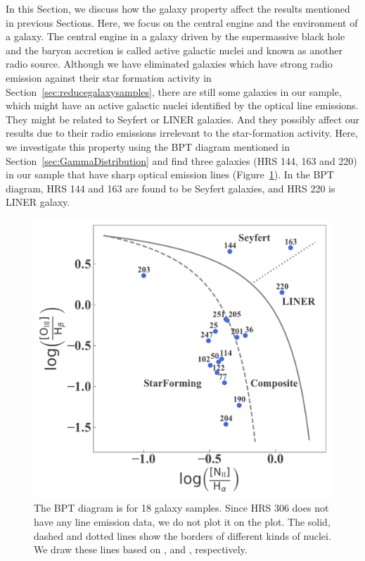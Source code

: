 In this Section, we discuss how the galaxy property affect the results mentioned in previous Sections.
Here, we focus on the central engine and the environment of a galaxy.
The central engine in a galaxy driven by the supermassive black hole and the baryon accretion is called active galactic nuclei and known as another radio source.
Although we have eliminated galaxies which have strong radio emission against their star formation activity in Section~\ref{sec:reducegalaxysamples}, there are still some galaxies in our sample, which might have an active galactic nuclei identified by the optical line emissions.
They might be related to Seyfert or LINER galaxies. 
And they possibly affect our results due to their radio emissions irrelevant to the star-formation activity.
Here, we investigate this property using the BPT diagram mentioned in Section~\ref{sec:GammaDistribution} and find three galaxies (HRS 144, 163 and 220) in our sample that have sharp optical emission lines (Figure~\ref{fig:bpt_diagram}).
In the BPT diagram, HRS 144 and 163 are found to be Seyfert galaxies, and HRS 220 is LINER galaxy.

\begin{figure}[htbp]
	\centering
	\includegraphics[width=.8\linewidth]{Chapter_6/Figures/Discuss_bpt.pdf}
    \caption[BPT diagram for 18 galaxy samples]{\label{fig:bpt_diagram}
        The BPT diagram is for 18 galaxy samples.
        Since HRS 306 does not have any line emission data, we do not plot it on the plot.
        The solid, dashed and dotted lines show the borders of different kinds of nuclei.
        We draw these lines based on \citet{Kewley2001}, \citet{Kauffmann2003} and \citet{Schawinski2007}, respectively.
    }
\end{figure}

